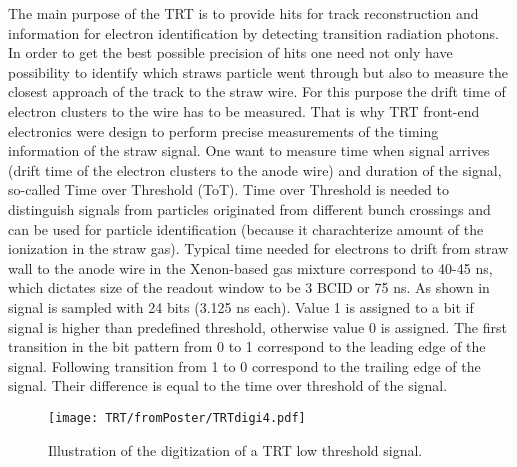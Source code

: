 The main purpose of the TRT is to provide hits for track reconstruction and information for electron identification by detecting transition radiation photons.
In order to get the best possible precision of hits one need not only have possibility to identify which straws particle went through 
but also to measure the closest approach of the track to the straw wire. For this purpose the drift time of electron clusters to the wire has to be measured.
That is why TRT front-end electronics were design to perform precise measurements of the timing information of the straw signal.
One want to measure time when signal arrives (drift time of the electron clusters to the anode wire) and duration of the signal, so-called Time over Threshold (ToT).
Time over Threshold is needed to distinguish signals from particles originated from different bunch crossings 
and can be used for particle identification (because it charachterize amount of the ionization in the straw gas).
Typical time needed for electrons to drift from straw wall to the anode wire in the Xenon-based gas mixture correspond to 40-45 ns, which dictates size of the readout window to be 
3 BCID or 75 ns. As shown in  signal is sampled with 24 bits (3.125 ns each). Value 1 is assigned to a bit if signal is higher than predefined threshold, 
otherwise value 0 is assigned. The first transition in the bit pattern from 0 to 1 correspond to the leading edge of the signal. Following transition from 1 to 0 
correspond to the trailing edge of the signal. Their difference is equal to the time over threshold of the signal. 

\begin{figure}
\begin{center}
 \texttt{[image: TRT/fromPoster/TRTdigi4.pdf]}
\caption{Illustration of the digitization of a TRT low threshold signal.}
\label{fig:pulseDigitization}
\end{center}
\end{figure}


